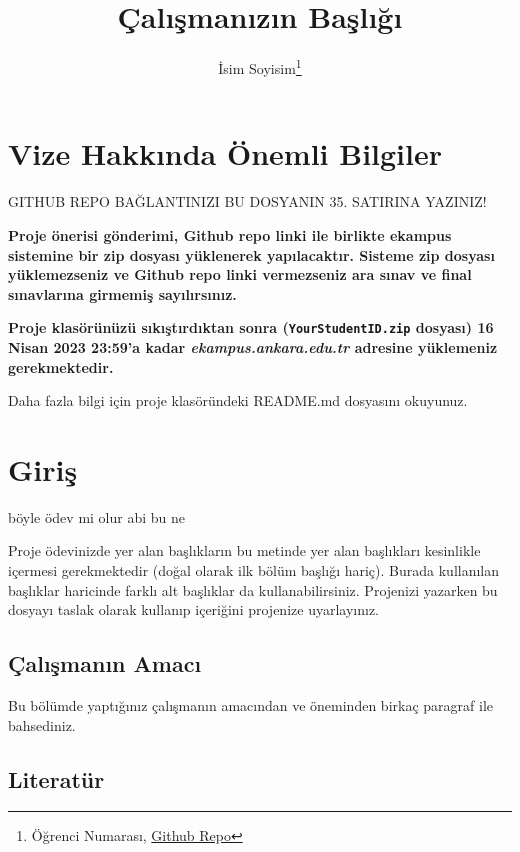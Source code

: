 \documentclass[
  12pt,
]{article}
\title{Çalışmanızın Başlığı}
\author{İsim Soyisim\footnote{Öğrenci Numarası, \href{https://github.com/KULLANICI_ADINIZ/REPO_ADINIZ}{Github Repo}}}
\date{}
\begin{document}
\maketitle

\hypertarget{vize-hakkux131nda-uxf6nemli-bilgiler}{%
\section{Vize Hakkında Önemli Bilgiler}\label{vize-hakkux131nda-uxf6nemli-bilgiler}}

\colorbox{BurntOrange}{GITHUB REPO BAĞLANTINIZI BU DOSYANIN 35. SATIRINA YAZINIZ!}

\textbf{Proje önerisi gönderimi, Github repo linki ile birlikte ekampus sistemine bir zip dosyası yüklenerek yapılacaktır. Sisteme zip dosyası yüklemezseniz ve Github repo linki vermezseniz ara sınav ve final sınavlarına girmemiş sayılırsınız.}

\textbf{Proje klasörünüzü sıkıştırdıktan sonra (\texttt{YourStudentID.zip} dosyası) 16 Nisan 2023 23:59'a kadar \emph{ekampus.ankara.edu.tr} adresine yüklemeniz gerekmektedir.}

\colorbox{WildStrawberry}{Daha fazla bilgi için proje klasöründeki README.md dosyasını okuyunuz.}

\hypertarget{giriux15f}{%
\section{Giriş}\label{giriux15f}}

böyle ödev mi olur abi bu ne

Proje ödevinizde yer alan başlıkların bu metinde yer alan başlıkları kesinlikle içermesi gerekmektedir (doğal olarak ilk bölüm başlığı hariç). Burada kullanılan başlıklar haricinde farklı alt başlıklar da kullanabilirsiniz. Projenizi yazarken bu dosyayı taslak olarak kullanıp içeriğini projenize uyarlayınız.

\hypertarget{uxe7alux131ux15fmanux131n-amacux131}{%
\subsection{Çalışmanın Amacı}\label{uxe7alux131ux15fmanux131n-amacux131}}

Bu bölümde yaptığınız çalışmanın amacından ve öneminden birkaç paragraf ile bahsediniz.

\hypertarget{literatuxfcr}{%
\subsection{Literatür}\label{literatuxfcr}}
\end{document}

